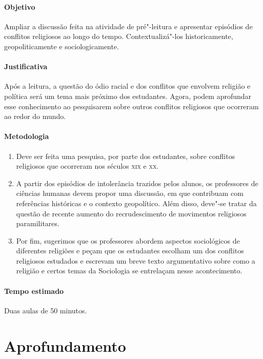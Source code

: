 \documentclass[12pt]{extarticle}
\begin{document}
\paragraph{Objetivo} Ampliar a discussão feita na atividade de pré"-leitura
e apresentar episódios de conflitos religiosos ao longo do tempo.
Contextualizá"-los historicamente, geopoliticamente e sociologicamente.

\paragraph{Justificativa} Após a leitura, a questão do ódio racial e dos
conflitos que envolvem religião e política será um tema mais próximo dos estudantes.
Agora, podem aprofundar esse conhecimento ao pesquisarem sobre outros conflitos 
religiosos que ocorreram ao redor do mundo.

\paragraph{Metodologia}

\begin{enumerate}

\item Deve ser feita uma pesquisa, por parte dos estudantes, sobre
conflitos religiosos que ocorreram nos séculos \textsc{xix} e \textsc{xx}. 

\item A partir dos episódios de intolerância trazidos pelos 
alunos, os professores de ciências humanas devem propor uma discussão,
em que contribuam com referências históricas e o contexto geopolítico.
Além disso, deve"-se tratar da questão de recente aumento do
recrudescimento de movimentos religiosos
paramilitares. 

\item Por fim, sugerimos que os professores abordem
aspectos sociológicos de diferentes
religiões e peçam que os estudantes escolham um 
dos conflitos religiosos estudados e escrevam um
breve texto argumentativo sobre como a religião
e certos temas da Sociologia se entrelaçam nesse acontecimento.

\end{enumerate}

\paragraph{Tempo estimado} Duas aulas de 50 minutos.


\section{Aprofundamento}
\end{document}
